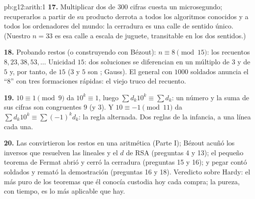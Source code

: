 \begin{solution}{pb:g12:arith:1}
\textbf{17.} Multiplicar dos  de $300$ cifras cuesta un microsegundo;
recuperarlos a partir de su producto derrota a todos los algoritmos
conocidos y a todos los ordenadores del mundo: la cerradura es una calle de
sentido único. (Nuestro $n = 33$ es esa calle a escala de juguete,
transitable en los dos sentidos.)

\textbf{18.} Probando restos (o construyendo con Bézout):
$n \equiv 8 \pmod{15}$: los recuentos $8, 23, 38, 53, \dots$ Unicidad
 $15$: dos soluciones se diferencian en un múltiplo de $3$ y de $5$
y, por tanto, de $15$ ($3$ y $5$ son ; Gauss). El general
con $1000$ soldados anuncia el ``$8$'' con tres formaciones rápidas: el
viejo truco del recuento.

\textbf{19.} $10 \equiv 1 \pmod 9$ da $10^k \equiv 1$, luego
$\sum d_k 10^k \equiv \sum d_k$: un número y la suma de sus cifras son
congruentes  $9$ (y  $3$). Y $10 \equiv -1 \pmod{11}$ da
$\sum d_k 10^k \equiv \sum (-1)^k d_k$: la regla alternada. Dos reglas de
la infancia, a una línea cada una.

\textbf{20.} Las  convirtieron los restos en una aritmética
(Parte I); Bézout acuñó los inversos que resuelven las 
lineales y el $d$ de RSA (preguntas 4 y 13); el pequeño teorema de Fermat
abrió y cerró la cerradura (preguntas 15 y 16); y pegar   contó soldados y remató la demostración (preguntas 16 y 18).
Veredicto sobre Hardy: el más puro de los teoremas que él conocía custodia
hoy cada compra; la pureza, con tiempo, es lo más aplicable que hay.
\end{solution}
